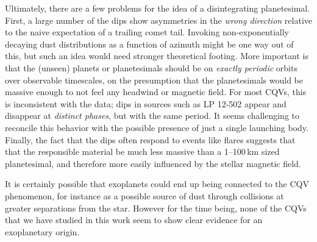 \documentclass[11pt,twocolumn,tighten]{aastex63}
\begin{document}


Ultimately, there are a few problems for the idea of a disintegrating
planetesimal.  First, a large number of the dips show asymmetries in
the {\it wrong direction} relative to the naive expectation of a
trailing comet tail.  Invoking non-exponentially decaying dust
distributions as a function of azimuth might be one way out of this,
but such an idea would need stronger theoretical footing.  More
important is that the (unseen) planets or planetesimals should be on
{\it exactly periodic} orbits over observable timescales, on the
presumption that the planetesimals would be massive enough to not feel
any headwind or magnetic field.  For most CQVs, this is inconsistent
with the data; dips in sources such as LP 12-502 appear and disappear
at {\it distinct phases}, but with the same period.  It seems
challenging to reconcile this behavior with the possible presence of
just a single launching body.  Finally, the fact that the dips often
respond to events like flares suggests that that the responsible
material be much less massive than a 1--100\,km sized planetesimal,
and therefore more easily influenced by the stellar magnetic field.

It is certainly possible that exoplanets could end up being connected
to the CQV phenomenon, for instance as a possible source of dust
through collisions at greater separations from the star.  However for
the time being, none of the CQVs that we have studied in this work
seem to show clear evidence for an exoplanetary origin.


\end{document}
